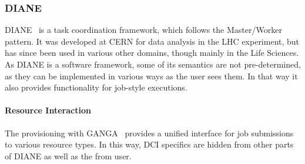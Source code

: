 \documentclass{sig-alternate}
\begin{document}

%
%
\subsubsection{DIANE}
\label{sec:diane}

DIANE~\cite{Moscicki:908910} is a task coordination framework, which follows
the Master/Worker pattern.
It was developed at CERN for data analysis in the LHC experiment, but has since
been used in various other domains, though mainly in the Life Sciences.
As DIANE is a software framework, some of its semantics are not pre-determined,
as they can be implemented in various ways as the user sees them.
In that way it also provides \pilot functionality for job-style executions.

\paragraph{Resource Interaction}
The \pilot provisioning with GANGA~\cite{Moscicki20092303} provides a unified
interface for job submissions to various resource types.
In this way, DCI specifics are hidden from other parts of DIANE as well as the
from user.
\end{document}
